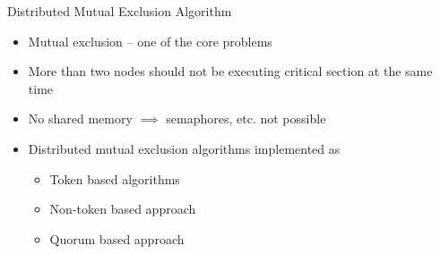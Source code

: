 \documentclass{beamer}
\begin{document}
		
	
	
		\begin{frame}{Distributed Mutual Exclusion Algorithm}
		\begin{itemize}
			\item Mutual exclusion -- one of the core problems 
			\item More than two nodes should not be executing critical section at the same time
			\item No shared memory $\implies$ semaphores, etc. not possible
			\item Distributed mutual exclusion algorithms implemented as
			\begin{itemize}
				\item Token based algorithms
				\item Non-token based approach
				\item Quorum based approach
			\end{itemize}
		\end{itemize}
		
	\end{frame}
\end{document}
